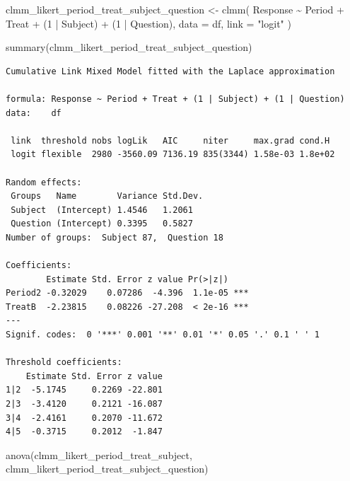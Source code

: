 \documentclass[
  letterpaper,
  DIV=11,
  numbers=noendperiod]{scrartcl}
\newenvironment{Shaded}{\begin{snugshade}}{\end{snugshade}}
\newcommand{\AttributeTok}[1]{\textcolor[rgb]{0.40,0.45,0.13}{#1}}
\newcommand{\DecValTok}[1]{\textcolor[rgb]{0.68,0.00,0.00}{#1}}
\newcommand{\FunctionTok}[1]{\textcolor[rgb]{0.28,0.35,0.67}{#1}}
\newcommand{\NormalTok}[1]{\textcolor[rgb]{0.00,0.23,0.31}{#1}}
\newcommand{\OtherTok}[1]{\textcolor[rgb]{0.00,0.23,0.31}{#1}}
\newcommand{\SpecialCharTok}[1]{\textcolor[rgb]{0.37,0.37,0.37}{#1}}
\newcommand{\StringTok}[1]{\textcolor[rgb]{0.13,0.47,0.30}{#1}}
\begin{document}
\begin{Shaded}
\begin{Highlighting}[]
\NormalTok{clmm\_likert\_period\_treat\_subject\_question }\OtherTok{\textless{}{-}}
    \FunctionTok{clmm}\NormalTok{(}
\NormalTok{        Response }\SpecialCharTok{\textasciitilde{}}\NormalTok{ Period }\SpecialCharTok{+}\NormalTok{ Treat }\SpecialCharTok{+}\NormalTok{ (}\DecValTok{1} \SpecialCharTok{|}\NormalTok{ Subject) }\SpecialCharTok{+}\NormalTok{ (}\DecValTok{1} \SpecialCharTok{|}\NormalTok{ Question),}
        \AttributeTok{data =}\NormalTok{ df, }\AttributeTok{link =} \StringTok{"logit"}
\NormalTok{    )}

\FunctionTok{summary}\NormalTok{(clmm\_likert\_period\_treat\_subject\_question)}
\end{Highlighting}
\end{Shaded}

\begin{verbatim}
Cumulative Link Mixed Model fitted with the Laplace approximation

formula: Response ~ Period + Treat + (1 | Subject) + (1 | Question)
data:    df

 link  threshold nobs logLik   AIC     niter     max.grad cond.H 
 logit flexible  2980 -3560.09 7136.19 835(3344) 1.58e-03 1.8e+02

Random effects:
 Groups   Name        Variance Std.Dev.
 Subject  (Intercept) 1.4546   1.2061  
 Question (Intercept) 0.3395   0.5827  
Number of groups:  Subject 87,  Question 18 

Coefficients:
        Estimate Std. Error z value Pr(>|z|)    
Period2 -0.32029    0.07286  -4.396  1.1e-05 ***
TreatB  -2.23815    0.08226 -27.208  < 2e-16 ***
---
Signif. codes:  0 '***' 0.001 '**' 0.01 '*' 0.05 '.' 0.1 ' ' 1

Threshold coefficients:
    Estimate Std. Error z value
1|2  -5.1745     0.2269 -22.801
2|3  -3.4120     0.2121 -16.087
3|4  -2.4161     0.2070 -11.672
4|5  -0.3715     0.2012  -1.847
\end{verbatim}

\begin{Shaded}
\begin{Highlighting}[]
\FunctionTok{anova}\NormalTok{(clmm\_likert\_period\_treat\_subject, clmm\_likert\_period\_treat\_subject\_question)}
\end{Highlighting}
\end{Shaded}
\end{document}

